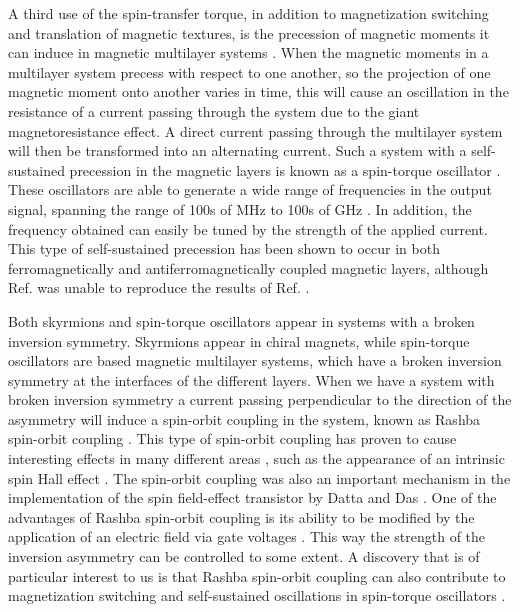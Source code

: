 A third use of the spin-transfer torque, in addition to magnetization switching and translation of magnetic textures, is the precession of magnetic moments it can induce in magnetic multilayer systems \cite{Tsoi2000,Kiselev2003,Rippard2004}. When the magnetic moments in a multilayer system precess with respect to one another, so the projection of one magnetic moment onto another varies in time, this will cause an oscillation in the resistance of a current passing through the system due to the giant magnetoresistance effect. A direct current passing through the multilayer system will then be transformed into an alternating current. Such a system with a self-sustained precession in the magnetic layers is known as a spin-torque oscillator \cite{Silva2008,Kim2012STO}. These oscillators are able to generate a wide range of frequencies in the output signal, spanning the range of 100s of MHz to 100s of GHz \cite{Katine2008,Silva2008,Sun2008}. In addition, the frequency obtained can easily be tuned by the strength of the applied current. This type of self-sustained precession has been shown to occur in both ferromagnetically \cite{Zhou2013} and antiferromagnetically \cite{Klein2012} coupled magnetic layers, although Ref. \cite{Zhou2013} was unable to reproduce the results of Ref. \cite{Klein2012}. 

Both skyrmions and spin-torque oscillators appear in systems with a broken inversion symmetry. Skyrmions appear in chiral magnets, while spin-torque oscillators are based magnetic multilayer systems, which have a broken inversion symmetry at the interfaces of the different layers. When we have a system with broken inversion symmetry a current passing perpendicular to the direction of the asymmetry will induce a spin-orbit coupling in the system, known as Rashba spin-orbit coupling \cite{BychovRashba1984,Heide2006}. This type of spin-orbit coupling has proven to cause interesting effects in many different areas \cite{Manchon2015}, such as the appearance of an intrinsic spin Hall effect \cite{Sinova2004}. The spin-orbit coupling was also an important mechanism in the implementation of the spin field-effect transistor by Datta and Das \cite{DattaDas1990}. One of the advantages of Rashba spin-orbit coupling is its ability to be modified by the application of an electric field via gate voltages \cite{Schultz1996,Nitta1997}. This way the strength of the inversion asymmetry can be controlled to some extent. A discovery that is of particular interest to us is that Rashba spin-orbit coupling can also contribute to magnetization switching and self-sustained oscillations in spin-torque oscillators \cite{Miron2011,Duan2014}.

